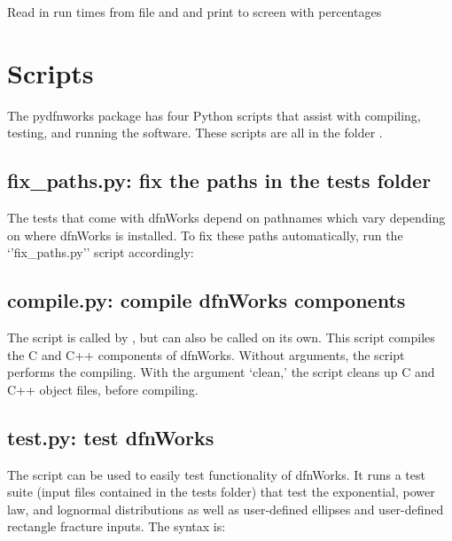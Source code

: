 \documentclass[letterpaper,10pt,english]{sphinxmanual}
\begin{document}

\begin{fulllineitems}
\label{\detokenize{pydfnworks:pydfnworks.helper.print_run_time}}
Read in run times from file and and print to screen with percentages

\end{fulllineitems}



\chapter{Scripts}
\label{\detokenize{scripts:scripts}}\label{\detokenize{scripts::doc}}\label{\detokenize{scripts:scripts-chapter}}
The pydfnworks package has four Python scripts that assist with compiling, testing, and running the software. These scripts are all in the folder  .


\section{fix\_paths.py: fix the paths in the tests folder}
\label{\detokenize{scripts:fix-paths-py-fix-the-paths-in-the-tests-folder}}
The tests that come with dfnWorks depend on pathnames which vary depending on where dfnWorks is installed. To fix these paths automatically, run the `'fix\_paths.py'' script accordingly:



\section{compile.py: compile dfnWorks components}
\label{\detokenize{scripts:compile-py-compile-dfnworks-components}}
The  script is called by , but can also be called on its own. This script compiles the C and C++ components of dfnWorks. Without arguments, the script performs the compiling. With the argument `clean,' the script cleans up C and C++ object files, before compiling.


\section{test.py: test dfnWorks}
\label{\detokenize{scripts:test-py-test-dfnworks}}
The  script can be used to easily test functionality of dfnWorks. It runs a test suite (input files contained in the tests folder) that test the exponential, power law, and lognormal distributions as well as user-defined ellipses and user-defined rectangle fracture inputs. The syntax is:
\end{document}
